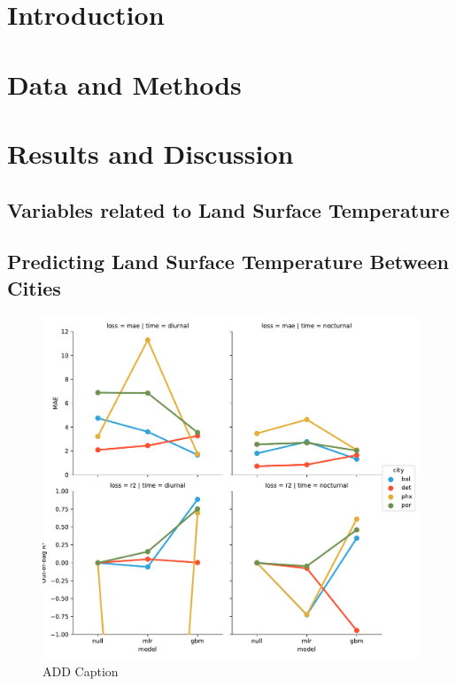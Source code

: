 \documentclass[]{elsarticle}
\begin{document}
\linenumbers

\section{Introduction}


\section{Data and Methods}


\section{Results and Discussion}

\subsection{Variables related to Land Surface Temperature}

\subsection{Predicting Land Surface Temperature Between Cities}

\begin{figure}[h]
\begin{center}
\includegraphics[width=\textwidth]{fig/report/cities_holdout.pdf}
\caption{ADD Caption}
\label{fig:cityholdout_errors}
\end{center}
\end{figure}
\end{document}
